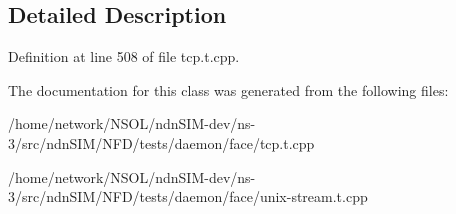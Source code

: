 \subsection{Detailed Description}


Definition at line 508 of file tcp.\+t.\+cpp.



The documentation for this class was generated from the following files\+:\begin{DoxyCompactItemize}
\item 
/home/network/\+N\+S\+O\+L/ndn\+S\+I\+M-\/dev/ns-\/3/src/ndn\+S\+I\+M/\+N\+F\+D/tests/daemon/face/tcp.\+t.\+cpp\item 
/home/network/\+N\+S\+O\+L/ndn\+S\+I\+M-\/dev/ns-\/3/src/ndn\+S\+I\+M/\+N\+F\+D/tests/daemon/face/unix-\/stream.\+t.\+cpp\end{DoxyCompactItemize}
